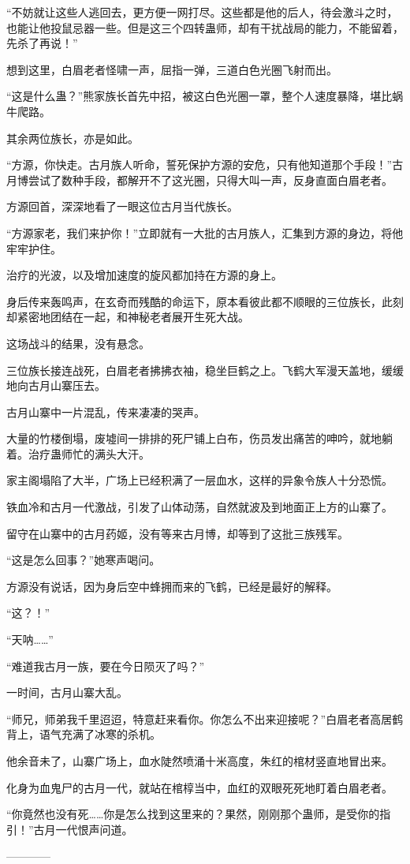 \begin{this_body}
“不妨就让这些人逃回去，更方便一网打尽。这些都是他的后人，待会激斗之时，也能让他投鼠忌器一些。但是这三个四转蛊师，却有干扰战局的能力，不能留着，先杀了再说！”

想到这里，白眉老者怪啸一声，屈指一弹，三道白色光圈飞射而出。

“这是什么蛊？”熊家族长首先中招，被这白色光圈一罩，整个人速度暴降，堪比蜗牛爬路。

其余两位族长，亦是如此。

“方源，你快走。古月族人听命，誓死保护方源的安危，只有他知道那个手段！”古月博尝试了数种手段，都解开不了这光圈，只得大叫一声，反身直面白眉老者。

方源回首，深深地看了一眼这位古月当代族长。

“方源家老，我们来护你！”立即就有一大批的古月族人，汇集到方源的身边，将他牢牢护住。

治疗的光波，以及增加速度的旋风都加持在方源的身上。

身后传来轰鸣声，在玄奇而残酷的命运下，原本看彼此都不顺眼的三位族长，此刻却紧密地团结在一起，和神秘老者展开生死大战。

这场战斗的结果，没有悬念。

三位族长接连战死，白眉老者拂拂衣袖，稳坐巨鹤之上。飞鹤大军漫天盖地，缓缓地向古月山寨压去。

古月山寨中一片混乱，传来凄凄的哭声。

大量的竹楼倒塌，废墟间一排排的死尸铺上白布，伤员发出痛苦的呻吟，就地躺着。治疗蛊师忙的满头大汗。

家主阁塌陷了大半，广场上已经积满了一层血水，这样的异象令族人十分恐慌。

铁血冷和古月一代激战，引发了山体动荡，自然就波及到地面正上方的山寨了。

留守在山寨中的古月药姬，没有等来古月博，却等到了这批三族残军。

“这是怎么回事？”她寒声喝问。

方源没有说话，因为身后空中蜂拥而来的飞鹤，已经是最好的解释。

“这？！”

“天呐……”

“难道我古月一族，要在今日陨灭了吗？”

一时间，古月山寨大乱。

“师兄，师弟我千里迢迢，特意赶来看你。你怎么不出来迎接呢？”白眉老者高居鹤背上，语气充满了冰寒的杀机。

他余音未了，山寨广场上，血水陡然喷涌十米高度，朱红的棺材竖直地冒出来。

化身为血鬼尸的古月一代，就站在棺椁当中，血红的双眼死死地盯着白眉老者。

“你竟然也没有死……你是怎么找到这里来的？果然，刚刚那个蛊师，是受你的指引！”古月一代恨声问道。

------------

\end{this_body}

